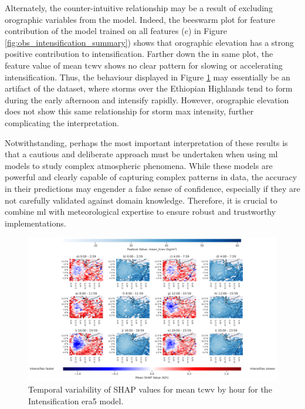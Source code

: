 Alternately, the counter-intuitive relationship may be a result of excluding orographic variables from the model. Indeed, the beeswarm plot for feature contribution of the model trained on all features (c) in Figure \ref{fig:obs_intensification_summary}) shows that orographic elevation has a strong positive contribution to intensification. Farther down the in same plot, the feature value of mean \acrshort{tcwv} shows no clear pattern for slowing or accelerating intensification. Thus, the behaviour displayed in Figure \ref{fig:obs_intensification_era5_shap_mean_tcwv_map_by_hour} may essentially be an artifact of the dataset, where storms over the Ethiopian Highlands tend to form during the early afternoon and intensify rapidly. However, orographic elevation does not show this same relationship for storm max intensity, further complicating the interpretation.

Notwithstanding, perhaps the most important interpretation of these results is that a cautious and deliberate approach must be undertaken when using \acrshort{ml} models to study complex atmospheric phenomena. While these models are powerful and clearly capable of capturing complex patterns in data, the accuracy in their predictions may engender a false sense of confidence, especially if they are not carefully validated against domain knowledge. Therefore, it is crucial to combine \acrshort{ml} with meteorological expertise to ensure robust and trustworthy implementations.

\begin{figure}[ht]
    \centering
    \includegraphics[width=\textwidth]{../figures/generated/experiments/obs_intensification/geographic_corr/obs_intensification_era5_shap_mean_tcwv_map_by_hour.png}
    \caption{Temporal variability of SHAP values for mean \acrshort{tcwv} by hour for the Intensification \acrshort{era5} model.}
    \label{fig:obs_intensification_era5_shap_mean_tcwv_map_by_hour}
\end{figure}

